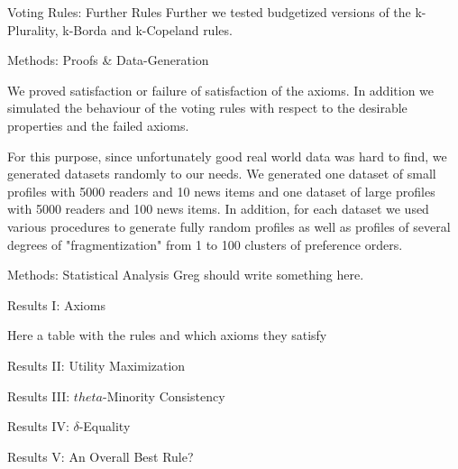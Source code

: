 \documentclass{beamer}
\begin{document}
\begin{frame}{Voting Rules: Further Rules}
	Further we tested budgetized versions of the k-Plurality, k-Borda and k-Copeland rules. 
\end{frame}

\begin{frame}{Methods: Proofs \& Data-Generation}

We proved satisfaction or failure of satisfaction of the axioms. In addition we simulated the behaviour of the voting rules with respect to the desirable properties and the failed axioms. 

For this purpose, since unfortunately good real world data was hard to find, we generated datasets randomly to our needs. We generated one dataset of small profiles with 5000 readers and 10 news items and one dataset of large profiles with 5000 readers and 100 news items. In addition, for each dataset we used various procedures to generate fully random profiles as well as profiles of several degrees of "fragmentization" from 1 to 100 clusters of preference orders.

\end{frame}

\begin{frame}{Methods: Statistical Analysis}
	Greg should write something here.
\end{frame}

\begin{frame}{Results I: Axioms}
	
	Here a table with the rules and which axioms they satisfy
	
\end{frame}

\begin{frame}{Results II: Utility Maximization}
	
\end{frame}

\begin{frame}{Results III: $theta$-Minority Consistency}
	
\end{frame}

\begin{frame}{Results IV: $\delta$-Equality}
	
\end{frame}

\begin{frame}{Results V: An Overall Best Rule?}
	
\end{frame}
\end{document}
